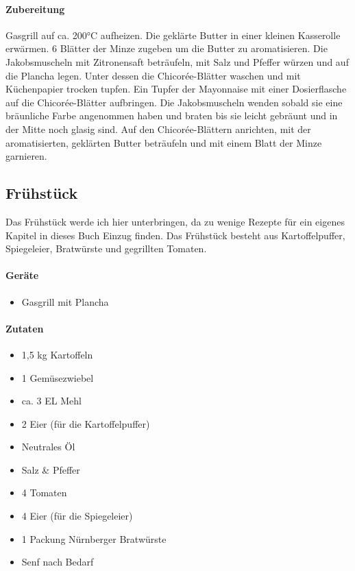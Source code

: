 \paragraph{Zubereitung}

Gasgrill auf ca. 200°C aufheizen. Die geklärte Butter in einer kleinen Kasserolle erwärmen. 6 Blätter der Minze zugeben um die Butter zu 
aromatisieren. Die Jakobsmuscheln mit Zitronensaft beträufeln, mit Salz und Pfeffer würzen und auf die Plancha legen. Unter dessen die 
Chicorée-Blätter waschen und mit  Küchenpapier trocken tupfen. Ein Tupfer der Mayonnaise mit einer Dosierflasche auf die Chicorée-Blätter 
aufbringen. Die Jakobsmuscheln wenden sobald sie eine bräunliche Farbe angenommen haben und braten bis sie leicht gebräunt und in der 
Mitte noch glasig sind. Auf den Chicorée-Blättern anrichten, mit der aromatisierten, geklärten Butter beträufeln und mit einem Blatt der Minze 
garnieren.
\newpage

\subsection{Frühstück}

Das Frühstück werde ich hier unterbringen, da zu wenige Rezepte für ein eigenes Kapitel in dieses Buch Einzug finden.
Das Frühstück besteht aus Kartoffelpuffer, Spiegeleier, Bratwürste und gegrillten Tomaten.

\paragraph{Geräte}

\begin{itemize}[noitemsep]
	\item Gasgrill mit Plancha
\end{itemize}

\paragraph{Zutaten}

\begin{itemize}[noitemsep]
	\item 1,5 kg Kartoffeln
	\item 1 Gemüsezwiebel
	\item ca. 3 EL Mehl
	\item 2 Eier (für die Kartoffelpuffer)
	\item Neutrales Öl
	\item Salz \& Pfeffer
	\item 4 Tomaten
	\item 4 Eier (für die Spiegeleier)
	\item 1 Packung Nürnberger Bratwürste
	\item Senf nach Bedarf
\end{itemize}

